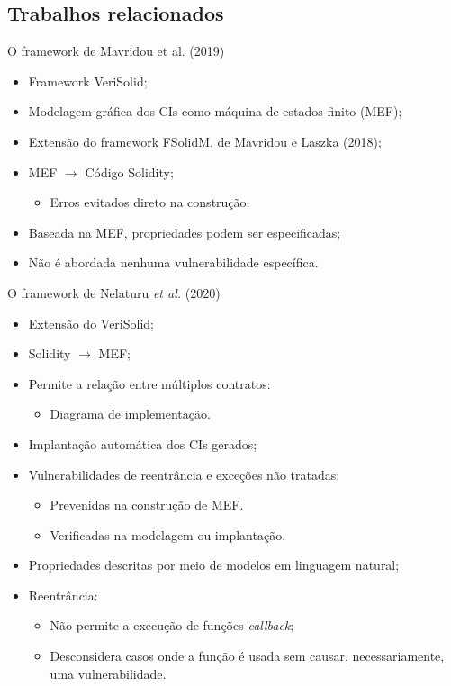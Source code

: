 \subsection{Trabalhos relacionados}
\begin{frame}{O framework de Mavridou et al. (2019)}
    \begin{itemize}
    	\item Framework VeriSolid;
    	\item Modelagem gráfica dos CIs como máquina de estados finito (MEF);
    	\item Extensão do framework FSolidM, de Mavridou e Laszka (2018);
    	\item MEF $\rightarrow$ Código Solidity;
    	\begin{itemize}
    		\item Erros evitados direto na construção.
    	\end{itemize}
    	\item Baseada na MEF, propriedades podem ser especificadas;
    	\item Não é abordada nenhuma vulnerabilidade específica.
    \end{itemize}
\end{frame}

\begin{frame}{O framework de Nelaturu \textit{et al.} (2020)}
	\begin{itemize}
		\item Extensão do VeriSolid;
		\item Solidity $\rightarrow$ MEF;
		\item Permite a relação entre múltiplos contratos:
		\begin{itemize}
			\item Diagrama de implementação.
		\end{itemize} 
		\item Implantação automática dos CIs gerados;
		\item Vulnerabilidades de reentrância e exceções não tratadas:
		\begin{itemize}
			\item Prevenidas na construção de MEF.
		\end{itemize}
		\begin{itemize}
			\item Verificadas na modelagem ou implantação.
		\end{itemize}
		\item Propriedades descritas por meio de modelos em linguagem natural;
		\item Reentrância:
		\begin{itemize}
			\item Não permite a execução de funções \textit{callback};
			\item Desconsidera casos onde a função é usada sem causar, necessariamente, uma vulnerabilidade.
		\end{itemize}
	\end{itemize}
\end{frame}

